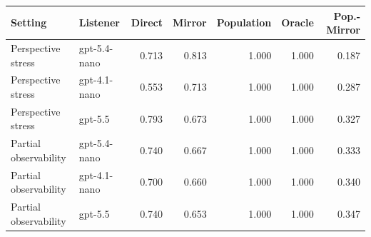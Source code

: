 \begin{tabular}{llrrrrr}
\toprule
Setting & Listener & Direct & Mirror & Population & Oracle & Pop.-Mirror \\
\midrule
Perspective stress & gpt-5.4-nano & 0.713 & 0.813 & 1.000 & 1.000 & 0.187 \\
Perspective stress & gpt-4.1-nano & 0.553 & 0.713 & 1.000 & 1.000 & 0.287 \\
Perspective stress & gpt-5.5 & 0.793 & 0.673 & 1.000 & 1.000 & 0.327 \\
Partial observability & gpt-5.4-nano & 0.740 & 0.667 & 1.000 & 1.000 & 0.333 \\
Partial observability & gpt-4.1-nano & 0.700 & 0.660 & 1.000 & 1.000 & 0.340 \\
Partial observability & gpt-5.5 & 0.740 & 0.653 & 1.000 & 1.000 & 0.347 \\
\bottomrule
\end{tabular}
